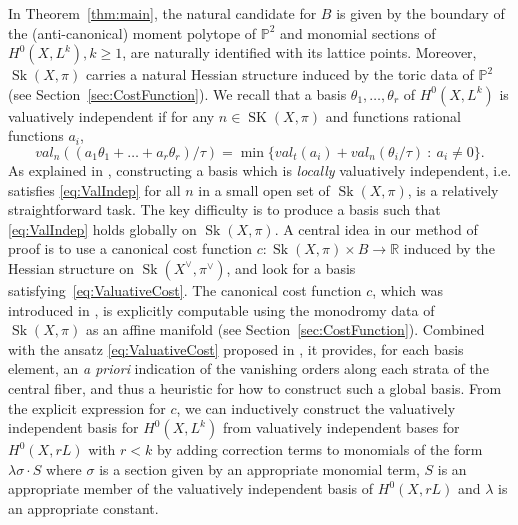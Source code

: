 \documentclass{article}
\newcommand{\RR}{\mathbb{R}}
\newcommand{\op}[1]{\operatorname{#1}}
\begin{document}
In Theorem~\ref{thm:main}, the natural candidate for $B$ is given by the boundary of the (anti-canonical) moment polytope of $\mathbb P^2$ and monomial sections of $H^0(X,L^k), k\geq 1$, are naturally identified with its lattice points. Moreover, $\op{Sk}(X,\pi)$ carries a natural Hessian structure induced by the toric data of $\mathbb P^2$ (see Section~\ref{sec:CostFunction}). 
We recall that a basis $\theta_1,\ldots,\theta_r$ of $H^0(X,L^k)$ is valuatively independent if for any $n\in \op{SK}(X,\pi)$ and functions rational functions $a_i$, 
\begin{equation}
val_n((a_1\theta_1+\dots+a_r\theta_r)/\tau) = \min\{val_t(a_i)+val_n(\theta_i/\tau) \ : \ a_i \neq 0 \}. \label{eq:ValIndep}
\end{equation}
As explained in \cite{LiCanonicalBasis}, constructing a basis which is \emph{locally} valuatively independent, i.e. satisfies \eqref{eq:ValIndep} for all $n$ in a small open set of $\op{Sk}(X,\pi)$, is a relatively straightforward task. The key difficulty is to produce a basis such that \eqref{eq:ValIndep} holds globally on $\op{Sk}(X,\pi)$. A central idea in our method of proof is to use a canonical cost function $c:\op{Sk}(X,\pi)\times B \to \RR$ induced by the Hessian structure on $\operatorname{Sk}(X^\vee,\pi^\vee)$, and look for a basis satisfying~\eqref{eq:ValuativeCost}. The canonical cost function $c$, which was introduced in \cite{HO}, is explicitly computable using the monodromy data of $\op{Sk}(X,\pi)$ as an affine manifold (see Section~\ref{sec:CostFunction}). Combined with the ansatz \eqref{eq:ValuativeCost} proposed in \cite{LiCanonicalBasis}, it provides, for each basis element, an \emph{a priori} indication of the vanishing orders along each strata of the central fiber, and thus a heuristic for how to construct such a global basis. From the explicit expression for $c$, we can inductively construct the valuatively independent basis for $H^0(X,L^k)$ from valuatively independent bases for $H^0(X,rL)$ with $r<k$ by adding correction terms to monomials of the form $\lambda\sigma \cdot S$ where $\sigma$ is a section given by an appropriate monomial term, $S$ is an appropriate member of the valuatively independent basis of $H^0(X,rL)$ 
and $\lambda$ is an appropriate constant. 

\end{document}
